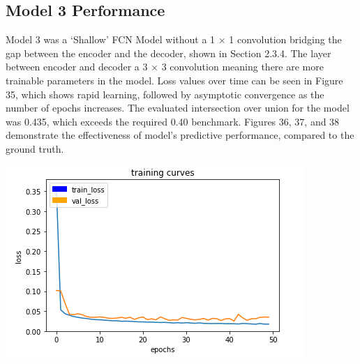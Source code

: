 \documentclass[a4paper]{article}
\begin{document}
\subsection{Model 3 Performance}
\begin{minipage}{0.45\textwidth}
Model 3 was a `Shallow' FCN Model without a 1 $\times$ 1 convolution bridging the gap between the encoder and the decoder, shown in Section 2.3.4. The layer between encoder and decoder a 3 $\times$ 3 convolution meaning there are more trainable parameters in the model. Loss values over time can be seen in Figure 35, which shows rapid learning, followed by asymptotic convergence as the number of epochs increases. The evaluated intersection over union for the model was 0.435, which exceeds the required 0.40 benchmark. Figures 36, 37, and 38 demonstrate the effectiveness of model's predictive performance, compared to the ground truth.
\end{minipage}
\hspace{1cm}
\begin{minipage}{0.45\textwidth}
\centering
\includegraphics[scale=0.5]{Model_3}
\end{minipage}

\vspace{0.5cm}
\end{document}
